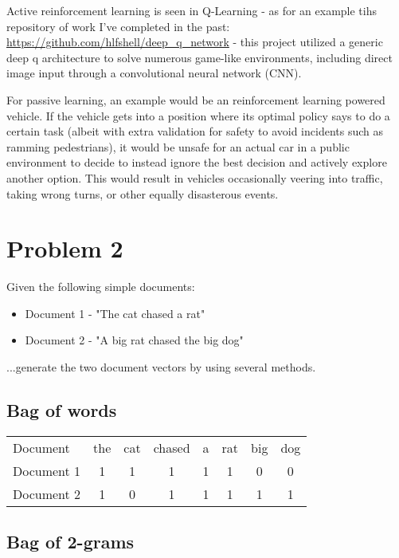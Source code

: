 \documentclass{article}
\begin{document}
Active reinforcement learning is seen in Q-Learning - as for an example tihs repository of work I've completed in the past: \url{https://github.com/hlfshell/deep_q_network} - this project utilized a generic deep q architecture to solve numerous game-like environments, including direct image input through a convolutional neural network (CNN).

For passive learning, an example would be an reinforcement learning powered vehicle. If the vehicle gets into a position where its optimal policy says to do a certain task (albeit with extra validation for safety to avoid incidents such as ramming pedestrians), it would be unsafe for an actual car in a public environment to decide to instead ignore the best decision and actively explore another option. This would result in vehicles occasionally veering into traffic, taking wrong turns, or other equally disasterous events.


\section*{Problem 2}

Given the following simple documents:

\begin{itemize}
    \item Document 1 - "The cat chased a rat"
    \item Document 2 - "A big rat chased the big dog"
\end{itemize}

\noindent ...generate the two document vectors by using several methods.

\subsection*{Bag of words}

\begin{center}
    \begin{tabular}{ l c c c c c c c }
        Document & the & cat & chased & a & rat & big & dog \\
        Document 1 & 1 & 1 & 1 & 1 & 1 & 0 & 0 \\
        Document 2 & 1 & 0 & 1 & 1 & 1 & 1 & 1 
    \end{tabular}
\end{center}

\subsection*{Bag of 2-grams}
\end{document}
